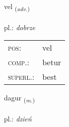 \documentclass[frontgrid, backgrid]{flacards}\usepackage[]{graphicx}\usepackage[]{xcolor}
\begin{document}
\renewcommand{\blhead}{\vskip5pt {\small\bfseries\footnotesize Atviksorð | Adverb }}
\renewcommand{\bcfoot}{\vskip5pt \hspace{2pt}{\small\bfseries\footnotesize 1K}}


{vel \small{\textsubscript{(\textit{adv.})}} \\[1ex] %
\textphonetic{[vɛːl]} \\
pl.: \emph{dobrze} \\  [2ex]
\renewcommand*{\arraystretch}{0.8}
\begin{tabular}{ll}
\textsc{pos}: & vel \\ 
\textsc{comp.}: & betur \\ 
\textsc{superl.}: & best \\
\end{tabular}
}

\renewcommand{\flhead}{\vskip5pt \fboxsep=0pt {\small\bfseries\footnotesize Nafnorð | Noun}}
\renewcommand{\fcfoot}{\vskip5pt \fboxsep=0pt \hspace{2pt}{\small\bfseries\footnotesize 1K}}

\renewcommand{\blhead}{\vskip5pt {\small\bfseries\footnotesize Nafnorð | Noun }}
\renewcommand{\bcfoot}{\vskip5pt \hspace{2pt}{\small\bfseries\footnotesize 1K}}


{dagur \small{\textsubscript{(\textit{m.})}} \\[1ex] %
\textphonetic{[taːɣʏr]} \\
pl.: \emph{dzień} \\  [2ex]
\renewcommand*{\arraystretch}{0.8}
}


\renewcommand{\flhead}{\vskip5pt \fboxsep=0pt {\small\bfseries\footnotesize Samtenging | Conjuction}}
\renewcommand{\fcfoot}{\vskip5pt \fboxsep=0pt \hspace{2pt}{\small\bfseries\footnotesize 1K}}
\end{document}

